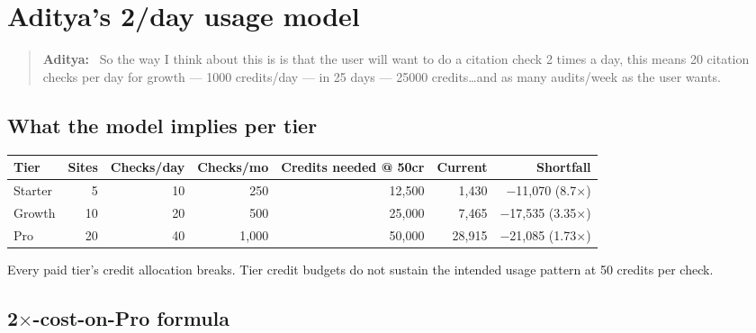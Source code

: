 \documentclass[11pt,letterpaper]{article}
\newenvironment{userturn}
  {\begin{quote}\small\color{brand}\textbf{Aditya:}~}
  {\end{quote}}
\newcommand{\warn}[1]{\textcolor{warn}{#1}}
\begin{document}
\section{Aditya's 2/day usage model}

\begin{userturn}
So the way I think about this is is that the user will want to do a citation
check 2 times a day, this means 20 citation checks per day for growth --- 1000
credits/day --- in 25 days --- 25000 credits\ldots and as many audits/week as
the user wants.
\end{userturn}

\subsection{What the model implies per tier}

\begin{center}
\begin{tabular}{@{}lrrrrrr@{}}
\toprule
\textbf{Tier} & \textbf{Sites} & \textbf{Checks/day} & \textbf{Checks/mo} & \textbf{Credits needed @ 50cr} & \textbf{Current} & \textbf{Shortfall} \\
\midrule
Starter & 5  & 10 & 250   & 12,500 & 1,430  & \warn{$-$11,070 (8.7$\times$)} \\
Growth  & 10 & 20 & 500   & 25,000 & 7,465  & \warn{$-$17,535 (3.35$\times$)} \\
Pro     & 20 & 40 & 1,000 & 50,000 & 28,915 & \warn{$-$21,085 (1.73$\times$)} \\
\bottomrule
\end{tabular}
\end{center}

Every paid tier's credit allocation breaks. Tier credit budgets do not
sustain the intended usage pattern at 50 credits per check.

\subsection{2$\times$-cost-on-Pro formula}
\end{document}
